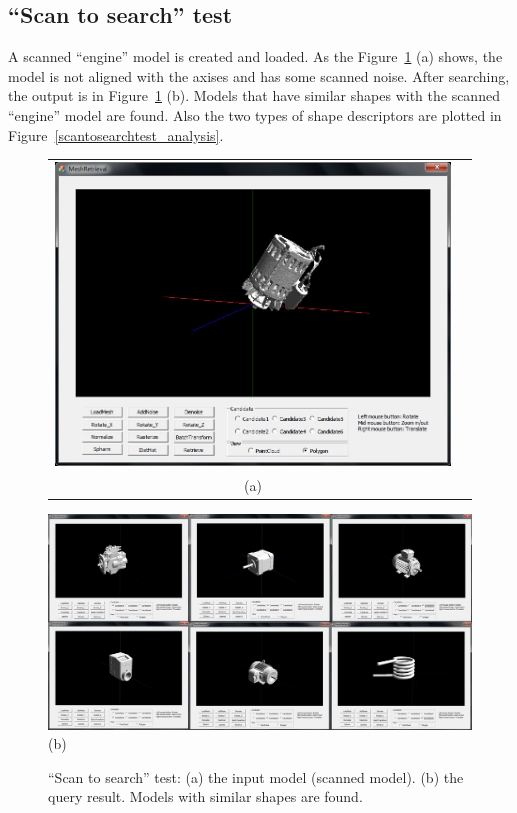 \subsection{``Scan to search'' test}

A scanned ``engine'' model is created and loaded. As the Figure~\ref{scantosearchtest_UI} (a) shows, the model is not aligned with the axises and has some scanned noise. After searching, the output is in Figure~\ref{scantosearchtest_UI} (b). Models that have similar shapes with the scanned ``engine'' model are found. Also the two types of shape descriptors are plotted in Figure~\ref{scantosearchtest_analysis}. 

\begin{figure}
\begin{center}
\begin{tabular}{cc}   %
   \includegraphics[width=0.6\linewidth]{input_scantosearch_test}  \\
   (a) \\
\end{tabular}
   \includegraphics[width=1\linewidth]{output_scantosearch_test}  \\
   (b) \\
\caption{``Scan to search'' test: (a) the input model (scanned model). (b) the query result. Models with similar shapes are found. } 
  \label{scantosearchtest_UI}
\end{center}
\end{figure}

